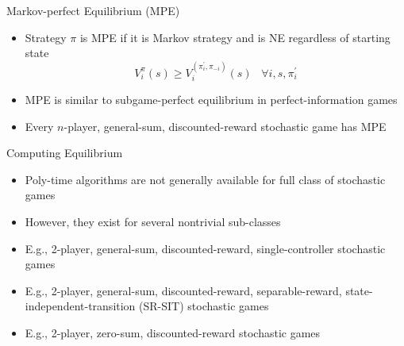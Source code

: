 \documentclass[11pt,aspectratio=169,handout]{beamer}
\begin{document}
  
  \begin{frame}{Markov-perfect Equilibrium (MPE)}
   \begin{itemize}
   \setlength{\itemsep}{1.5em}
    \item Strategy $\pi$ is \alert{MPE} if it is Markov strategy and is NE regardless of starting state
    $$V_i^{\pi}(s) \ge V_i^{(\pi^\prime_i, \pi_{-i})}(s) \;\;\; \forall i, s, \pi_i^\prime$$
    \item MPE is similar to \alert{subgame-perfect equilibrium} in perfect-information games
    \item Every $n$-player, general-sum, \alert{discounted-reward} stochastic game has MPE
   \end{itemize}
  \end{frame}
  
  
  \begin{frame}{Computing Equilibrium}
   \begin{itemize}[<+->] 
   \setlength{\itemsep}{0.7em}
    \item Poly-time algorithms are not generally available for full class of stochastic games
    \item However, they exist for several nontrivial sub-classes
    \item E.g., 2-player, general-sum, discounted-reward, \alert{single-controller} stochastic games
    \item E.g., 2-player, general-sum, discounted-reward, \alert{separable-reward, state-independent-transition (SR-SIT)} stochastic games
    \item E.g., 2-player, zero-sum, discounted-reward stochastic games
   \end{itemize}
  \end{frame}
  
\end{document}
